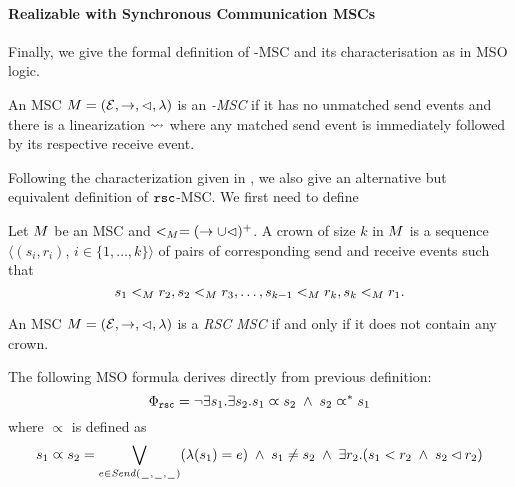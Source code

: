 \medskip




\paragraph{\bf Realizable with Synchronous Communication MSCs} Finally, we give the formal definition of  \rsc-MSC and its characterisation as in MSO logic.
\begin{definition}\label{def:rsc}
	An MSC $M = (\mathcal{E},\to,\lhd,\lambda)$ is an \emph{\rsc-MSC} if it has no unmatched send events and there is a linearization $\rightsquigarrow$ where any matched send event is immediately followed by its respective receive event.
\end{definition}

Following the characterization given in \cite[Theorem 4.4]{DBLP:journals/dc/Charron-BostMT96}, we also give an alternative but equivalent definition of $\mathtt{rsc}$-MSC. We first need to define



\begin{definition}
	Let $M$ be an MSC and $<_M = (\to \cup \lhd)^+$. A crown of size $k$ in $M$ is a sequence $\langle(s_i,r_i),\, i \in \{1,\dots,k\}\rangle$ of pairs of corresponding send and receive events such that
	\[
		s_1 <_M r_2, s_2 <_M r_3, \dots, s_{k-1} <_M r_k, s_k <_M r_1.
	\]
\end{definition}


\begin{definition} \label{def:rsc_alt}
	An MSC $M = (\mathcal{E},\to,\lhd,\lambda)$ is a \emph{RSC MSC} if and only if it does not contain any crown.
\end{definition}


The following MSO formula derives directly from previous  definition:
\[\Phi_{\mathtt{rsc}} = \neg \exists s_1.\exists s_2. s_1 \varpropto s_2 \;\wedge\; s_2 \varpropto^\ast s_1
\]
\noindent where $\varpropto$ is defined as
\[
s_1 \varpropto s_2 = 
\bigvee_{\substack{e \in {\mathit{Send}(\hspace{0.1em}\underline{\hspace{0.5em}}\hspace{0.1em},\hspace{0.1em}\underline{\hspace{0.5em}}\hspace{0.1em},\hspace{0.1em}\underline{\hspace{0.5em}}\hspace{0.1em})}}}(\lambda(s_1) = e) \;\wedge\;
s_1 \neq s_2 \;\wedge\; 
\exists r_2. (s_1 < r_2 \;\wedge\; s_2 \lhd r_2)
\]



